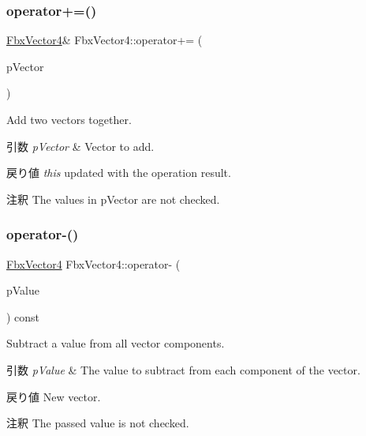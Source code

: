 \subsubsection{\texorpdfstring{operator+=()}{operator+=()}\hspace{0.1cm}{\footnotesize\ttfamily [2/2]}}
{\footnotesize\ttfamily \hyperlink{class_fbx_vector4}{Fbx\+Vector4}\& Fbx\+Vector4\+::operator+= (\begin{DoxyParamCaption}\item[{const \hyperlink{class_fbx_vector4}{Fbx\+Vector4} \&}]{p\+Vector }\end{DoxyParamCaption})}

Add two vectors together. 
\begin{DoxyParams}{引数}
{\em p\+Vector} & Vector to add. \\
\hline
\end{DoxyParams}
\begin{DoxyReturn}{戻り値}
{\itshape this} updated with the operation result. 
\end{DoxyReturn}
\begin{DoxyRemark}{注釈}
The values in p\+Vector are not checked. 
\end{DoxyRemark}
\mbox{\label{class_fbx_vector4_a121047a8e75df11dbd8ec10c0cff8cbb}} 
\subsubsection{\texorpdfstring{operator-\/()}{operator-()}\hspace{0.1cm}{\footnotesize\ttfamily [1/3]}}
{\footnotesize\ttfamily \hyperlink{class_fbx_vector4}{Fbx\+Vector4} Fbx\+Vector4\+::operator-\/ (\begin{DoxyParamCaption}\item[{double}]{p\+Value }\end{DoxyParamCaption}) const}

Subtract a value from all vector components. 
\begin{DoxyParams}{引数}
{\em p\+Value} & The value to subtract from each component of the vector. \\
\hline
\end{DoxyParams}
\begin{DoxyReturn}{戻り値}
New vector. 
\end{DoxyReturn}
\begin{DoxyRemark}{注釈}
The passed value is not checked. 
\end{DoxyRemark}
\mbox{\label{class_fbx_vector4_aee704c3c0622de74004355ff999c934b}} 
